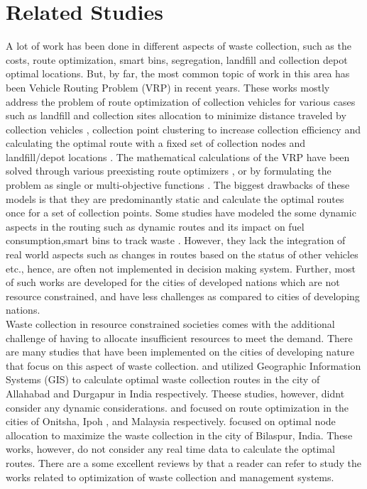 \documentclass[12pt]{article}
\begin{document}
\section{Related Studies}

A lot of work has been done in different aspects of waste collection, such as the costs, route optimization, smart bins, segregation, landfill and collection depot optimal locations. But, by far, the most common topic of work in this area has been Vehicle Routing Problem (VRP) in recent years. These works mostly address the problem of route optimization of collection vehicles for various cases such as landfill and collection sites allocation to minimize distance traveled by collection vehicles \cite{kulcar1996optimizing,rathore2020location,barzehkar2019landfill}, collection point clustering to increase collection efficiency \cite{al2021optimization} and calculating the optimal route with a fixed set of collection nodes and landfill/depot locations \cite{karadimas2008routing, amal2018sga, asefi2019mathematical,de2007decision, hannan2020waste,akhtar2017backtracking}. The mathematical calculations of the VRP have been solved through various preexisting route optimizers  \cite{karadimas2008routing,amal2018sga, malakahmad2014solid}, or by formulating the problem as single or multi-objective functions \cite{hannan2020waste,de2007decision}. The biggest drawbacks of these models is that they are predominantly static and calculate the optimal routes once for a set of collection points. Some studies have modeled the some dynamic aspects in the  routing such as dynamic routes and its impact on fuel consumption\cite{hannan2020waste},smart bins to track waste \cite{akhtar2017backtracking,lozano2018smart,baldo2021multi}. However, they lack the integration of real world aspects such as changes in routes based on the status of other vehicles etc., hence, are often not implemented in decision making system\cite{hannan2020waste}. Further, most of such works are developed for the cities of developed nations which are not resource constrained, and have less challenges as compared to cities of developing nations.\\
Waste collection in resource constrained societies comes with the additional challenge of having to allocate insufficient resources to meet the demand. There are many studies that have been implemented on the cities of developing nature  that focus on this aspect of waste collection. \cite{chaudhary2019gis} and \cite{sk2020optimal} utilized Geographic Information Systems (GIS) to calculate optimal waste collection routes in the city of Allahabad and Durgapur in India respectively. Theese studies, however, didnt consider any dynamic considerations.\cite{ogwueleke2009route} and \cite{malakahmad2014solid} focused on route optimization in the cities of Onitsha, Ipoh , and Malaysia respectively.  \cite{rathore2020location} focused on optimal node allocation to maximize the waste collection in the city of Bilaspur, India.  These works, however, do not consider any real time data to calculate the optimal routes. 
There are a some excellent reviews by \cite{belien2014municipal,sulemana2018optimal,abdallah2020artificial} that a reader can refer to study the works related to optimization of waste collection and management systems. 
\end{document}
